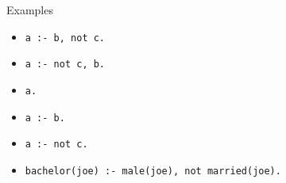 \begin{frame}{Examples}
  \begin{itemize}
  \item<1-> \lstinline{a :- b, not c.}
    \smallskip
  \item<2-> \lstinline{a :- not c, b.}
    \medskip
  \item<3-> \lstinline{a.}
  \item<3-> \lstinline{a :- b.}
  \item<3-> \lstinline{a :- not c.}
    \medskip
  \item<4-> \lstinline{bachelor(joe) :- male(joe), not married(joe).}
  \end{itemize}
\end{frame}

